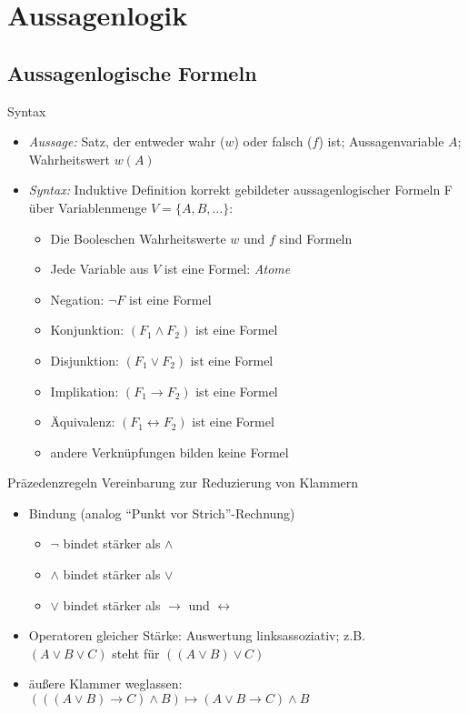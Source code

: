 \section{Aussagenlogik}

\subsection{Aussagenlogische Formeln}

\begin{frame}{Syntax}
	\begin{itemize}
		\item \emph{Aussage:} Satz, der entweder wahr ($w$) oder falsch ($f$) ist; Aussagenvariable $A$; Wahrheitswert $w(A)$
		\item \emph{Syntax:} Induktive Definition korrekt gebildeter aussagenlogischer Formeln F über Variablenmenge $V=\{A, B, \ldots\}$:
		\begin{itemize}
			\item Die Booleschen Wahrheitswerte $w$ und $f$ sind Formeln
			\item Jede Variable aus $V$ ist eine Formel: \emph{Atome}
			\item Negation: $\neg F$ ist eine Formel
			\item Konjunktion: $(F_1 \land F_2)$ ist eine Formel
			\item Disjunktion: $(F_1 \lor F_2)$ ist eine Formel
			\item Implikation: $(F_1 \rightarrow F_2)$ ist eine Formel
			\item Äquivalenz: $(F_1 \leftrightarrow F_2)$ ist eine Formel
			\item andere Verknüpfungen bilden keine Formel
		\end{itemize}
	\end{itemize}
\end{frame}

\begin{frame}{Präzedenzregeln}
	Vereinbarung zur Reduzierung von Klammern
	\begin{itemize}
		\item Bindung (analog "`Punkt vor Strich"'-Rechnung)
		\begin{itemize}
			\item $\neg$ bindet stärker als $\land$
			\item $\land$ bindet stärker als $\lor$
			\item $\lor$ bindet stärker als $\rightarrow$ und $\leftrightarrow$
		\end{itemize}
		\item Operatoren gleicher Stärke: Auswertung linksassoziativ; z.B. \\ $(A \lor B \lor C)$ steht für $((A \lor B) \lor C)$
		\item äußere Klammer weglassen: $(((A \lor B) \rightarrow C) \land B) \mapsto (A \lor B \rightarrow C) \land B$
	\end{itemize}
\end{frame}

